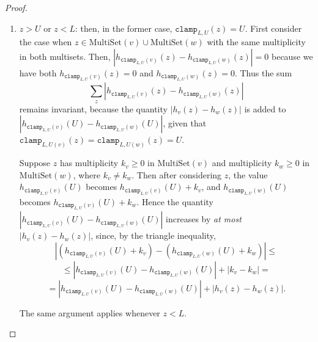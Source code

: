 \documentclass[11pt,a4paper]{article}
\theoremstyle{definition}
\newcommand{\MultiSet}{\mathrm{MultiSet}}
\newcommand{\clamp}{\texttt{clamp}}
\newcommand{\silvia}[1]{{ {\color{blue}{(silvia)~#1}}}}
\newcommand{\grace}[1]{{ {\color{purple}{(grace)~#1}}}}
\begin{document}
\begin{proof}
\begin{enumerate}
    \item $z > U$ or $z < L$: then, in the former case, $\clamp_{L, U}(z) = U$. First consider the case when $z \in \MultiSet(v) \cup \MultiSet(w)$ with the same multiplicity in both multisets. Then, $|h_{\clamp_{L, U}(v)}(z) - h_{\clamp_{L, U}(w)}(z)| = 0$ because we have both $h_{\clamp_{L, U}(v)}(z) = 0$ and $h_{\clamp_{L, U}(w)}(z) = 0$. Thus the sum
    \[
    \sum_z |h_{\clamp_{L, U}(v)}(z) - h_{\clamp_{L, U}(w)}(z)|
    \]
    remains invariant, because the quantity $|h_{v}(z) - h_{w}(z)|$ is added to $|h_{\clamp_{L, U}(v)}(U) - h_{\clamp_{L, U}(w)}(U)|$, given that $\clamp_{L, U(v)}(z) = \clamp_{L, U (w)}(z) = U$. 
    
    \grace{Good explanation, especially w word invariant.}
    
    Suppose $z$ has multiplicity $k_v \geq 0$ in $\MultiSet(v)$ and multiplicity $k_w \geq 0$ in $\MultiSet(w)$, where $k_v \neq k_w$. Then after considering $z$, the value $h_{\clamp_{L, U}(v)}(U)$ becomes $h_{\clamp_{L, U}(v)}(U) + k_v$, and $h_{\clamp_{L, U}(w)}(U)$ becomes $h_{\clamp_{L, U}(v)}(U) + k_w$. Hence the quantity $|h_{\clamp_{L, U}(v)}(U) - h_{\clamp_{L, U}(w)}(U)|$ increases by \textit{at most} $|h_v(z) - h_w(z)|$, since, by the triangle inequality,
    \[
         |(h_{\clamp_{L, U}(v)}(U) + k_v) - (h_{\clamp_{L, U}(w)}(U) + k_w)| \leq
    \]
    \[
         \leq |h_{\clamp_{L, U}(v)}(U) - h_{\clamp_{L, U}(w)}(U)| + |k_v - k_w| =
    \]
    \[
        = |h_{\clamp_{L, U}(v)}(U) - h_{\clamp_{L, U}(w)}(U)| + |h_v(z) - h_w(z)|.
    \]
    
    
    
    The same argument applies whenever $z < L$. 
    
    \silvia{The first subcase discussed here, i.e., when $k_v = k_w$, is also proven by the triangle inequality expression above, but it seemed clean to separate the case where the total sum remains invariant.}
    

\end{enumerate}
\end{proof}
\end{document}
